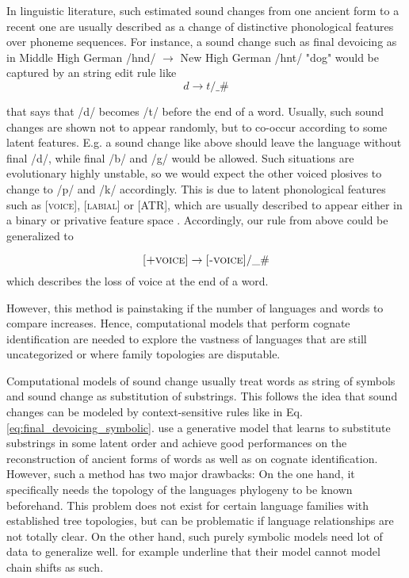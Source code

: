 \documentclass[6pt]{article}
\begin{document}
In linguistic literature, such estimated sound changes from one ancient form to a recent one are usually described as a change of distinctive phonological features over phoneme sequences. For instance, a sound change such as final devoicing as in Middle High German /hnd/ $\rightarrow$ New High German /hnt/ "dog" would be captured by an string edit rule like
\begin{equation}
d \rightarrow t / \_ \#
\label{eq:final_devoicing_symbolic}
\end{equation}

that says that /d/ becomes /t/ before the end of a word. Usually, such sound changes are shown not to appear randomly, but to co-occur according to some latent features. E.g. a sound change like above should leave the language without final /d/, while final /b/ and /g/ would be allowed. Such situations are evolutionary highly unstable, so we would expect the other voiced plosives to change to /p/ and /k/ accordingly. This is due to latent phonological features such as \textsc{[voice]}, \textsc{[labial]} or \textsc{[ATR]}, which are usually described to appear either in a binary or privative feature space \citep{chomsky1968sound}. Accordingly, our rule from above could be generalized to

\begin{equation}
\textsc{[+voice]} \rightarrow \textsc{[-voice]} / \_ \#
\label{eq:final_devoicing}
\end{equation}
which describes the loss of voice at the end of a word.

However, this method is painstaking if the number of languages and words to compare increases. Hence, computational models that perform cognate identification are needed to explore the vastness of languages that are still uncategorized or where family topologies are disputable.

Computational models of sound change usually treat words as string of symbols and sound change as substitution of substrings. This follows the idea that sound changes can be modeled by context-sensitive rules like in Eq. \ref{eq:final_devoicing_symbolic}. \cite{bouchard2007probabilistic,bouchard2013automated} use a generative model that learns to substitute substrings in some latent order and achieve good performances on the reconstruction of ancient forms of words as well as on cognate identification. However, such a method has two major drawbacks: On the one hand, it specifically needs the topology of the languages phylogeny to be known beforehand. This problem does not exist for certain language families with established tree topologies, but can be problematic if language relationships are not totally clear. On the other hand, such purely symbolic models need lot of data to generalize well. \cite{bouchard2007probabilistic} for example underline that their model cannot model chain shifts as such.
\end{document}
